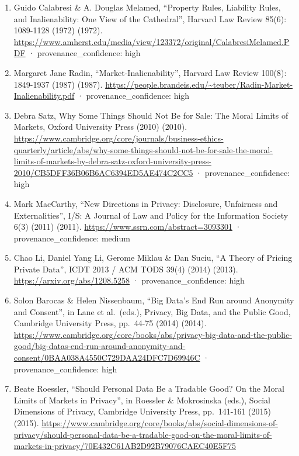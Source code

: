 \documentclass[
  11pt,
]{article}
\providecommand{\tightlist}{%
  \setlength{\itemsep}{0pt}\setlength{\parskip}{0pt}}
\begin{document}
\begin{enumerate}
\def\labelenumi{\arabic{enumi}.}
\tightlist
\item
  Guido Calabresi \& A. Douglas Melamed, ``Property Rules, Liability
  Rules, and Inalienability: One View of the Cathedral'', Harvard Law
  Review 85(6): 1089-1128 (1972) (1972).
  \url{https://www.amherst.edu/media/view/123372/original/CalabresiMelamed.PDF}
  · provenance\_confidence: high
\item
  Margaret Jane Radin, ``Market-Inalienability'', Harvard Law Review
  100(8): 1849-1937 (1987) (1987).
  \url{https://people.brandeis.edu/~teuber/Radin-Market-Inalienability.pdf}
  · provenance\_confidence: high
\item
  Debra Satz, Why Some Things Should Not Be for Sale: The Moral Limits
  of Markets, Oxford University Press (2010) (2010).
  \url{https://www.cambridge.org/core/journals/business-ethics-quarterly/article/abs/why-some-things-should-not-be-for-sale-the-moral-limits-of-markets-by-debra-satz-oxford-university-press-2010/CB5DFF36B06B6AC6394ED5AE474C2CC5}
  · provenance\_confidence: high
\item
  Mark MacCarthy, ``New Directions in Privacy: Disclosure, Unfairness
  and Externalities'', I/S: A Journal of Law and Policy for the
  Information Society 6(3) (2011) (2011).
  \url{https://www.ssrn.com/abstract=3093301} · provenance\_confidence:
  medium
\item
  Chao Li, Daniel Yang Li, Gerome Miklau \& Dan Suciu, ``A Theory of
  Pricing Private Data'', ICDT 2013 / ACM TODS 39(4) (2014) (2013).
  \url{https://arxiv.org/abs/1208.5258} · provenance\_confidence: high
\item
  Solon Barocas \& Helen Nissenbaum, ``Big Data's End Run around
  Anonymity and Consent'', in Lane et al.~(eds.), Privacy, Big Data, and
  the Public Good, Cambridge University Press, pp.~44-75 (2014) (2014).
  \url{https://www.cambridge.org/core/books/abs/privacy-big-data-and-the-public-good/big-datas-end-run-around-anonymity-and-consent/0BAA038A4550C729DAA24DFC7D69946C}
  · provenance\_confidence: high
\item
  Beate Roessler, ``Should Personal Data Be a Tradable Good? On the
  Moral Limits of Markets in Privacy'', in Roessler \& Mokrosinska
  (eds.), Social Dimensions of Privacy, Cambridge University Press,
  pp.~141-161 (2015) (2015).
  \url{https://www.cambridge.org/core/books/abs/social-dimensions-of-privacy/should-personal-data-be-a-tradable-good-on-the-moral-limits-of-markets-in-privacy/70E432C61AB2D92B79076CAEC40E5F75}

\end{enumerate}
\end{document}
